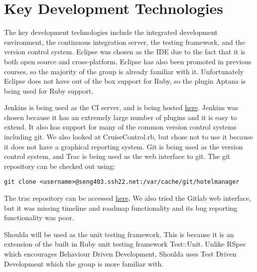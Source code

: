 \section{Key Development Technologies}

The key development technologies include the integrated development environment, the continuous integration server, the testing framework, and the version control system.
Eclipse was chosen as the IDE due to the fact that it is both open source and cross-platform. Eclipse has also been promoted in previous courses, so the majority of the group is already familiar with it. Unfortunately Eclipse does not have out of the box support for Ruby, so the plugin Aptana is being used for Ruby support.

Jenkins is being used as the CI server, and is being hosted \href{http://seng403.ssh22.net/jenkins}{here}. Jenkins was chosen because it has an extremely large number of plugins and it is easy to extend. It also has support for many of the common version control systems including git. We also looked at CruiseControl.rb, but chose not to use it because it does not have a graphical reporting system. Git is being used as the version control system, and Trac is being used as the web interface to git. The git repository can be checked out using:
\lstset{language=bash}
\begin{lstlisting}
git clone <username>@seng403.ssh22.net:/var/cache/git/hotelmanager
\end{lstlisting}
The trac repository can be accessed \href{http://seng403.ssh22.net/trac}{here}. We also tried the Gitlab web interface, but it was missing timeline and roadmap functionality and its bug reporting functionality was poor.

Shoulda will be used as the unit testing framework. This is because it is an extension of the built in Ruby unit testing framework Test::Unit. Unlike RSpec which encourages Behaviour Driven Development, Shoulda uses Test Driven Development which the group is more familiar with.
